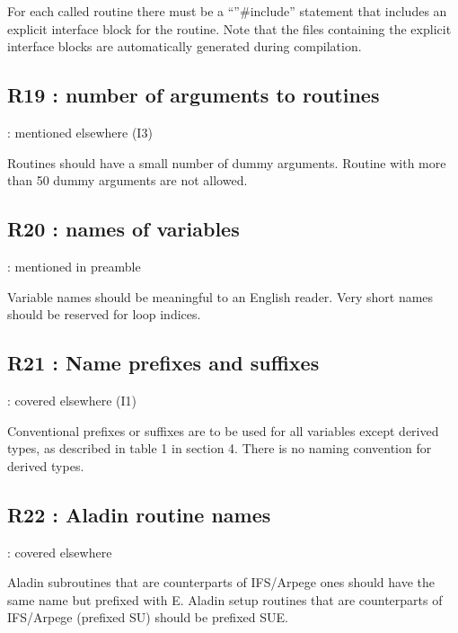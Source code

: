 \documentclass[letterpaper,10pt,english]{sphinxmanual}
\begin{document}
For each called routine there must be a “”\#include” statement that includes an explicit interface block for the routine.
Note that the files containing the explicit interface blocks are automatically generated during compilation.


\subsection{R19 : number of arguments to routines}
\label{\detokenize{obsolescent/r19:r19-number-of-arguments-to-routines}}\label{\detokenize{obsolescent/r19::doc}}
 : mentioned elsewhere (I3)

Routines should have a small number of dummy arguments.
Routine with more than 50 dummy arguments are not allowed.


\subsection{R20 : names of variables}
\label{\detokenize{obsolescent/r20:r20-names-of-variables}}\label{\detokenize{obsolescent/r20::doc}}
 : mentioned in preamble

Variable names should be meaningful to an English reader.
Very short names should be reserved for loop indices.


\subsection{R21 :  Name prefixes and suffixes}
\label{\detokenize{obsolescent/r21:r21-name-prefixes-and-suffixes}}\label{\detokenize{obsolescent/r21::doc}}
 : covered elsewhere (I1)

Conventional prefixes or suffixes are to be used for all variables except derived types,
as described in table 1 in section 4.
There is no naming convention for derived types.


\subsection{R22 : Aladin routine names}
\label{\detokenize{obsolescent/r22:r22-aladin-routine-names}}\label{\detokenize{obsolescent/r22::doc}}
 : covered elsewhere

Aladin subroutines that are counterparts of IFS/Arpege ones should have the same name but prefixed
with E.
Aladin setup routines that are counterparts of IFS/Arpege (prefixed SU) should be prefixed SUE.
\end{document}
